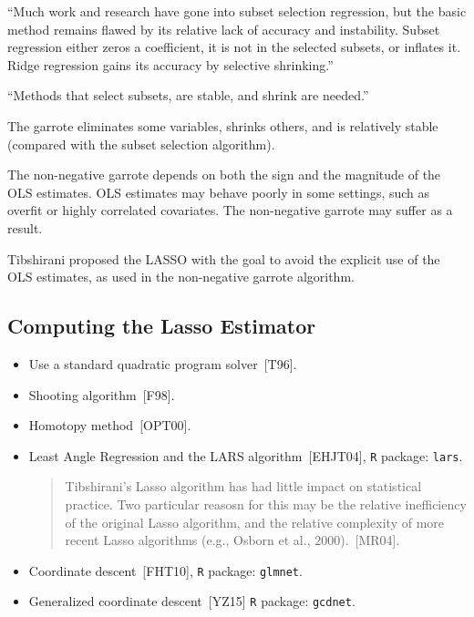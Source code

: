 \documentclass[twoside]{article}
\renewcommand{\cite}[1]{[#1]}
\begin{document}
``Much work and research have gone into subset selection regression, but the basic method remains flawed by its relative lack of accuracy and instability. Subset regression either zeros a coefficient, it is not in the selected subsets, or inflates it. Ridge regression gains its accuracy by selective shrinking.''

``Methods that select subsets, are stable, and shrink are needed.''

The garrote eliminates some variables, shrinks others, and is relatively stable (compared with the subset selection algorithm). 

The non-negative garrote depends on both the sign and the magnitude of the OLS estimates. OLS estimates may behave poorly in some settings, such as overfit or highly correlated covariates. The non-negative garrote may suffer as a result.

Tibshirani proposed the LASSO with the goal to avoid the explicit use of the OLS estimates, as used in the non-negative garrote algorithm.

\subsection{Computing the Lasso Estimator}

\begin{itemize}
	\item Use a standard quadratic program solver~\cite{T96}.
	\item Shooting algorithm~\cite{F98}.
	\item Homotopy method~\cite{OPT00}.
	\item Least Angle Regression and the LARS algorithm~\cite{EHJT04}, \texttt{R} package: \texttt{lars}.
	
	\begin{quote}
		Tibshirani's Lasso algorithm has had little impact on statistical practice. Two particular reasosn for this may be the relative inefficiency of the original Lasso algorithm, and the relative complexity of more recent Lasso algorithms (e.g., Osborn et al., 2000).~\cite{MR04}.
	\end{quote}
	
	\item Coordinate descent~\cite{FHT10}, \texttt{R} package: \texttt{glmnet}.
	\item Generalized coordinate descent~\cite{YZ15} \texttt{R} package: \texttt{gcdnet}.
\end{itemize}
\end{document}
